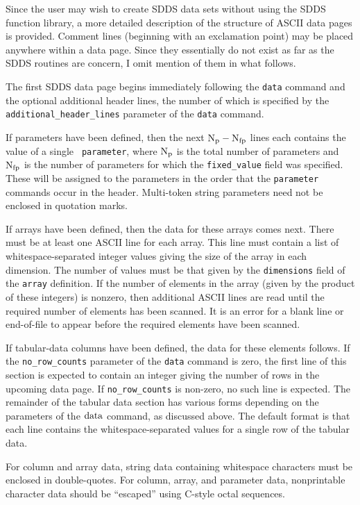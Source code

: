 \documentclass[11pt]{article}
\begin{document}
Since the user may wish to create SDDS data sets without using the SDDS function library, a more detailed
description of the structure of ASCII data pages is provided.  Comment lines (beginning with an exclamation point)
may be placed anywhere within a data page.  Since they essentially do not exist as far as the SDDS routines are
concern, I omit mention of them in what follows.

The first SDDS data page begins immediately following the {\tt data} command and the optional additional header
lines, the number of which is specified by the \verb|additional_header_lines| parameter of the {\tt data} command.

If parameters have been defined, then the next ${\rm N_p-N_{fp}}$ lines each contains the value of a single {\tt
parameter}, where ${\rm N_p}$ is the total number of parameters and ${\rm N_{fp}}$ is the number of parameters for
which the \verb|fixed_value| field was specified.  These will be assigned to the parameters in the order that the
\verb|parameter| commands occur in the header.  Multi-token string parameters need not be enclosed in quotation marks.

If arrays have been defined, then the data for these arrays comes next.  There must be at least one ASCII
line for each array.  This line must contain a list of whitespace-separated integer values giving the
size of the array in each dimension.  The number of values must be that given by the {\tt dimensions}
field of the {\tt array} definition.  If the number of elements in the array (given by the product of
these integers) is nonzero, then additional ASCII lines are read until the required number of elements
has been scanned.  It is an error for a blank line or end-of-file to appear before the required elements
have been scanned.

If tabular-data columns have been defined, the data for these elements follows. If the \verb|no_row_counts|
parameter of the {\tt data} command is zero, the first line of this section is expected to contain an integer giving
the number of rows in the upcoming data page.  If \verb|no_row_counts| is non-zero, no such line is expected.  The
remainder of the tabular data section has various forms depending on the parameters of the ${\rm data}$ command, as
discussed above.  The default format is that each line contains the whitespace-separated values for a single row of
the tabular data.  

For column and array data, string data containing whitespace characters must be enclosed in double-quotes.  For column,
array, and parameter data, nonprintable character data should be ``escaped'' using C-style octal sequences.
\end{document}
